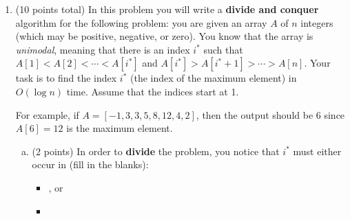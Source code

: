 \documentclass[11pt]{article}
\begin{document}
\begin{enumerate}
\begin{enumerate}[(a)]
\begin{center}
\begin{tikzpicture}
\end{tikzpicture}
\end{center}
\item (3 points) What is the work per level in terms of level $\ell$?
\vspace{1in}
\item (2 points) Is the work per level (circle one)
\begin{itemize}
    \item increasing (work is dominated by leaves)
    \item decreasing (work is dominated by root)
    \item the same (work is the same at every level)
\end{itemize}
\item (3 points)  What is the total number of levels in the tree? (fill in the base and the argument of the logarithm)
\[
\text{number of levels} = \log_{\underline{\hspace{1cm}}}(\underline{\hspace{1cm}})
\]

\item (2 points) What is the overall non-recursive runtime of the recurrence?

\vspace{1in}
\end{enumerate}

\item (10 points total) In this problem you will write a \textbf{divide and conquer} algorithm for the following problem: you
are given an array $A$ of $n$ integers (which may be positive, negative, or zero).
You know that the array is \emph{unimodal}, meaning that there is an index $i^*$ such that
$A[1] < A[2] < \cdots < A[i^*]$ and $A[i^*] > A[i^* + 1] > \cdots > A[n]$.
Your task is to find the index $i^*$ (the index of the maximum element) in $O(\log n)$ time.
Assume that the indices start at 1.

For example, if $A = [-1, 3, 3, 5, 8, 12, 4, 2]$, then the output should be $6$ since
$A[6] = 12$ is the maximum element.

\begin{enumerate}[(a)]
    \item (2 points) In order to \textbf{divide} the problem, you notice that $i^*$ must
     either occur in (fill in the blanks):
\begin{itemize}
    \item \underline{\hspace{4in}}, or
    \item \underline{\hspace{4in}}
\end{itemize}


\end{enumerate}
\end{enumerate}
\end{document}
